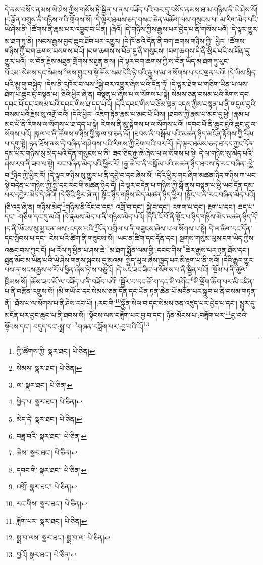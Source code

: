 དེ་ནས་བསོད་ནམས་ཡེ་ཤེས་ཀྱིས་གསོས་ཏེ་སྦྱིན་པ་ནས་བཟོད་པའི་བར་དུ་བསོད་ནམས་ཐ་མ་གཉིས་ནི་ཡེ་ཤེས་སོ། །བརྩོན་འགྲུས་ནི་གཉིས་ཀའི་གྲོགས་སོ། །དེ་ལྟར་ཐམས་ཅད་གསང་ཆེན་མཆོག་ལས་གསུངས་པ། མ་རིག་མེད་པའི་ཡེ་ཤེས་ནི། །ཚོགས་ནི་རྣམ་པར་འབྱུང་བ་ཡིན། །ཞེའོ། །དེ་གཉིས་ཀྱིས་རྒྱས་པར་བྱེད་པ་ནི་གསོས་པའོ། །དེ་ལྟར་གྱུར་མ་ཐག་ཏུ་ནི། །སངས་རྒྱས་བྱང་ཆུབ་ཐོབ་པར་འགྱུར། །དེ་ཁོ་ནའི་དོན་ནི་བག་ཆགས་གཉིས་ཀྱི་\footnote{ཀྱི་ཚོགས་ཀྱི་  སྣར་ཐང་།  པེ་ཅིན། }ཕྱིར། །ཚོགས་གཉིས་ཀྱི་བག་ཆགས་བསགས་པའོ། །བག་ཆགས་ས་བོན་དུ་ནི་གསུངས། །བག་ཆགས་དེ་ནི་སྲིད་པའི་ས་བོན་དུ་གྱུར་པའོ། །ས་བོན་རྗེས་མཐུན་གྲོགས་མཐུན་ནས། །དེ་ལྟར་བག་ཆགས་ཀྱི་ས་བོན་ཡོད་མ་ཐག་ཏུ་ཕུང་པོའམ་:སེམས་དང་སེམས་\footnote{སེམས་  སྣར་ཐང་།  པེ་ཅིན། }ལས་བྱུང་བ་སྟེ་ཆོས་སམ་དེའི་ཉེ་བའི་རྒྱུ་ཕ་མ་ལ་སོགས་པ་དང་ལྡན་པའོ། །དེ་ཡིས་སྲིད་པའི་མྱུ་གུ་བསྐྱེད། །དེས་ནི་འཁོར་བ་ལས་\footnote{ལ་  སྣར་ཐང་།  པེ་ཅིན། }སྐྱེ་བར་འགྱུར་ཞེས་པའི་དོན་ཏོ། །དེ་ལྟར་ཐེག་པ་གཅིག་ཡིན་པ་ལས་ཐེག་པ་ཆུང་ངུ་བསྟན་པ། ཅིའི་ཕྱིར་ཞེ་ན། བསྟན་པ་ཞེས་པ་ལ་སོགས་པ་སྟེ། སེམས་ཅན་བསམ་པའི་རིགས་དང་དབང་པོ་དང་བསམ་པའི་དབང་གིས་ཐ་དད་པའོ། །དེའི་དབང་གིས་བཅོམ་ལྡན་འདས་ཀྱིས་བསྟན་པ་ནི་གདུལ་བྱའི་བསམ་པའི་རྗེས་སུ་འགྲོ་བའོ། །དེའི་ཕྱིར། འཇིག་རྟེན་རྣམ་པ་མང་པོ་ཡིས། །ཐབས་ཀྱི་རྣམ་པ་མང་དུ་ཕྱེ། །རྣམ་པ་མང་པོ་ནི་རིགས་ལ་སོགས་པ་ཐ་དད་པ་སྟེ། རིགས་ནི་མུ་སྟེགས་པ་ལ་སོགས་པའོ། །དབང་པོ་ནི་ཆུང་ངུའི་ཆུང་ངུ་ལ་སོགས་པའོ། །སྐལ་བ་ནི་ཚོགས་གཉིས་ཀྱི་སྐལ་བ་ཅན་ནོ། །ཐབས་ནི་བསྒོམ་པའི་མཚན་ཉིད་མངོན་རྟོགས་ཀྱི་རིམ་པ་དགུ་སྟེ། ཉན་ཐོས་ནས་དེ་བཞིན་གཤེགས་པའི་རིགས་ཀྱི་ཐེག་པའི་བར་རོ། །དེ་ལྟར་ཐམས་ཅད་ཐ་དད་ཀྱང་དོན་དམ་པར་གཉིས་སུ་མེད་པའི་དོན་གསུངས་པ་ནི། ཟབ་ཅིང་རྒྱ་ཆེ་ཞེས་པ་ལ་སོགས་པ་སྟེ། དེ་ལ་གཉིས་སུ་མེད་པའི་ཤེས་རབ་ནི་ཟབ་པ་སྟེ། རང་བཞིན་མེད་པའི་ཕྱིར་རོ། །རྒྱ་ཆེ་བ་ནི་བསྒོམ་པའི་མཚན་ཉིད་ཐབས་ཏེ་རང་བཞིན་:ཕྱེ་བ་\footnote{ཕྱེད་པ་  སྣར་ཐང་།  པེ་ཅིན། }ཉིད་ཀྱི་ཕྱིར་རོ། །དེ་ལྟར་གཉིས་སུ་གྱུར་པ་ནི་དབྱེ་བ་དང་ཞེས་སོ། །དེའི་ཕྱིར་གང་ཞིག་མཚན་ཉིད་གཉིས་ཀ་ཡང་སྟེ་བདེན་པ་གཉིས་ཀྱི་སྤྱི་དང་རང་གི་མཚན་ཉིད་དོ། །དེ་ལྟར་བདེན་པ་གཉིས་ཀྱི་སྒོ་ནས་བསྟན་པ་ཕྱེ་ཡང་དོན་དམ་པར་དབྱེར་མེད་དེ་ཞེའོ། །དེ་ཅིའི་ཕྱིར་ཞེ་ན། སྟོང་ཉིད་གཉིས་མེད་མཚན་ཉིད་ཕྱིར། །སྟོང་པ་ནི་རང་བཞིན་མེད་པའོ། །ཅི་འདྲ་ཞེ་ན། གཉིས་མེད་\footnote{མེད་དེ་  སྣར་ཐང་།  པེ་ཅིན། }གཉིས་ནི་འོང་བ་དང་། འགྲོ་བ་དང་། སྐྱེ་བ་དང་། འགག་པ་དང་། རྟག་པ་དང་། ཆད་པ་དང་། གཅིག་དང་དུ་མའོ། །དེ་རྣམས་མེད་པ་ནི་གཉིས་མེད་པའོ། །དེའི་ངོ་བོ་ནི་སྟོང་པ་ཉིད་གཉིས་མེད་མཚན་ཉིད་དོ། །ད་ནི་ཡོངས་སུ་མྱ་ངན་ལས་:འདས་པའི་\footnote{བཟླ་བའི་  སྣར་ཐང་།  པེ་ཅིན། }དོན་འགྲེལ་པ་ནི་གཟུངས་ཞེས་པ་ལ་སོགས་པ་སྟེ། དེ་ལ་ཚིག་དང་དོན་དང་སྤོབས་པ་དང་། ངེས་པའི་ཚིག་ནི་གཟུངས་སོ། །ཡང་ན་ཚིག་དང་དོན་དང་། སྔགས་གསུམ་ལུས་ངག་ཡིད་ཀྱིས་འཆང་བས་ཀྱང་ངོ། །ཕ་རོལ་ཏུ་ཕྱིན་པ་ཤས་ཆེ་\footnote{ཆེས་  སྣར་ཐང་།  པེ་ཅིན། }མ་ཐག་སྨོན་ལམ་གྱི་:དབང་གིས་\footnote{དབང་གི་  སྣར་ཐང་།  པེ་ཅིན། }ཆེར་རྒྱས་པར་ཉན་ཐོས་དང་། ཐུན་མོང་མ་ཡིན་པའི་ཡེ་ཤེས་གནས་སྐབས་དུ་མའམ། སྤྱོད་ཡུལ་ཞེས་ཁྱད་པར་མི་རྟག་པ་ནི་སའོ། །དེའི་རྒྱུར་གྱུར་པས་ན་སངས་རྒྱས་ཕ་རོལ་ཕྱིན་ཞེས་ཏེ་ས་བཅུའོ། །དེ་ཡང་ཟང་ཟིང་ལ་སོགས་པ་ནི་སྦྱིན་པའོ། །སྡོམ་པ་ནི་ཚུལ་ཁྲིམས་སོ། །ཆོས་ཟབ་མོ་ལ་བཟོད་པ་ནི་བཟོད་པའོ། །སྦྱོར་བ་དང་ཆོ་ག་དང་མི་འགོང་\footnote{འགྲོ་  སྣར་ཐང་།  པེ་ཅིན། }མི་ལྡོག་ཆོག་པར་མི་འཛིན་པ་ནི་བརྩོན་འགྲུས་སོ། །མི་གཡོ་བ་དང་སེམས་ཅན་དོན་དང་ཡོན་ཏན་ཆེན་པོ་མངོན་པར་སྒྲུབ་པ་ནི་བསམ་གཏན་ནོ། །ཐོས་པ་ལ་སོགས་པ་ནི་ཤེས་རབ་པོ། །:རང་གི་\footnote{རང་གིས་  སྣར་ཐང་།  པེ་ཅིན། }སྐྱོན་སེལ་བ་དང་སེམས་ཅན་འཛུད་པར་བྱེད་པ་དང་། མྱུར་དུ་མངོན་པར་བྱང་ཆུབ་པ་ནི་ཐབས་སོ། །སྟོབས་ལས་བཟློག་པར་བྱ་བ་དང་། ཉོན་མོངས་པ་:བཟློག་པར་\footnote{ཟློག་པར་  སྣར་ཐང་།  པེ་ཅིན། }བྱ་བའི་སྟོབས་དང་། བདུད་དང་:སྨྲ་བ་\footnote{སྨྲ་བ་ལས་  སྣར་ཐང་། སྨྲ་བ་ལ་  པེ་ཅིན། }གཞན་བཟློག་པར་:བྱ་བའི་འོ།\footnote{བྱའོ།  སྣར་ཐང་།  པེ་ཅིན། } 
